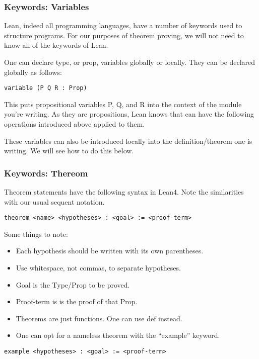 \documentclass{beamer}
\theoremstyle{indentDefn} \newtheorem{defn}[]{Definition}
\begin{document}
\begin{frame}[fragile]
\frametitle{Keywords: Variables}

Lean, indeed all programming languages, have a number of keywords used to structure programs. For our purposes of theorem proving, we will not need to know all of the keywords of Lean. 

One can declare type, or prop, variables globally or locally. They can be declared globally as follows: 

\begin{lstlisting}
variable (P Q R : Prop)
\end{lstlisting}

This puts propositional variables P, Q, and R into the context of the module you're writing. As they are propositions, Lean knows that can have the following operations introduced above applied to them.

These variables can also be introduced locally into the definition/theorem one is writing. We will see how to do this below.

\end{frame}

\begin{frame}[fragile]
	\frametitle{Keywords: Thereom}

Theorem statements have the following syntax in Lean4. Note the similarities with our usual sequent notation.

\vspace{5mm}

\small{
\begin{lstlisting}
theorem <name> <hypotheses> : <goal> := <proof-term>
\end{lstlisting}	}

Some things to note: 
\begin{itemize}
	\item Each hypothesis should be written with its own parentheses. 
	\item Use whitespace, not commas, to separate hypotheses.
	\item Goal is the Type/Prop to be proved.
	\item Proof-term is is the proof of that Prop.
	\item Theorems are just functions. One can use def instead.
	\item One can opt for a nameless theorem with the ``example'' keyword. 
\end{itemize}

\small{
\begin{lstlisting}
example <hypotheses> : <goal> := <proof-term>
\end{lstlisting}	}
\end{frame}
\end{document}
